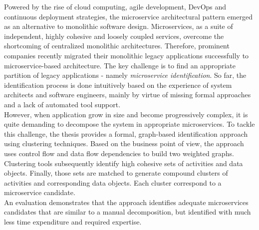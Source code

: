 

\Abstract
Powered by the rise of cloud computing, agile development, DevOps and continuous deployment strategies, the microservice architectural pattern emerged as an alternative to monolithic software design. Microservices, as a suite of independent, highly cohesive and loosely coupled services, overcome the shortcoming of centralized monolithic architectures. Therefore, prominent companies recently migrated their monolithic legacy applications successfully to microservice-based architecture. The key challenge is to find an appropriate partition of legacy applications - namely \textit{microservice identification}. So far, the identification process is done intuitively based on the experience of system architects and software engineers, mainly by virtue of missing formal approaches and a lack of automated tool support. \\
However, when application grow in size and become progressively complex, it is quite demanding to decompose the system in appropriate microservices.
To tackle this challenge, the thesis provides a formal, graph-based identification approach using clustering techniques. Based on the business point of view, the approach uses control flow and data flow dependencies to build two weighted graphs. Clustering tools subsequently identify high cohesive sets of activities and data objects. Finally, those sets are matched to generate compound clusters of activities and corresponding data objects. Each cluster correspond to a microservice candidate. \\
An evaluation demonstrates that the approach identifies adequate microservices candidates that are similar to a manual decomposition, but identified with much less time expenditure and required expertise.


